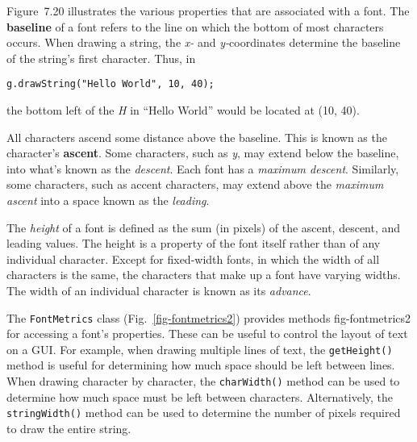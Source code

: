 Figure~7.20 illustrates the various properties that
are associated with a font.   The {\bf baseline} of a font refers to
the line on which the bottom of most characters occurs.  When drawing a
string, the {\it x-} and {\it y-}coordinates determine the baseline of
the string's first character.  Thus, in

\begin{jjjlisting}
\begin{lstlisting}
g.drawString("Hello World", 10, 40);
\end{lstlisting}
\end{jjjlisting}

\noindent the bottom left of the {\it H} in ``Hello World'' would be
located at (10, 40).

All characters ascend some distance above the baseline.  This is known
as the character's {\bf ascent}.  Some characters, such as {\it y},
may extend below the baseline, into what's known as the {\it
descent}. Each font has a {\it maximum descent}.  Similarly, some
characters, such as accent characters, may extend above the {\it
maximum ascent} into a space known as the {\it leading}.

The {\it height} of a font is defined as the sum (in pixels) of the
ascent, descent, and leading values.  The height is a property of the
font itself rather than of any individual character.   Except for
fixed-width fonts, in which the width of all characters is the same,
the characters that make up a font have varying widths.  The width of
an individual character is known as its {\it advance}.



The {\tt FontMetrics} class (Fig.~\ref{fig-fontmetrics2}) provides methods
{fig-fontmetrics2}
for accessing a font's properties.  These can be useful to control the
layout of text on a GUI.  For example, when drawing multiple lines of
text, the {\tt getHeight()} method is useful for determining how much
space should be left between lines.  When drawing character by
character, the {\tt charWidth()} method can be used to determine how
much space must be left between characters.  Alternatively, the {\tt
stringWidth()} method can be used to determine the number of pixels
required to draw the entire string.

